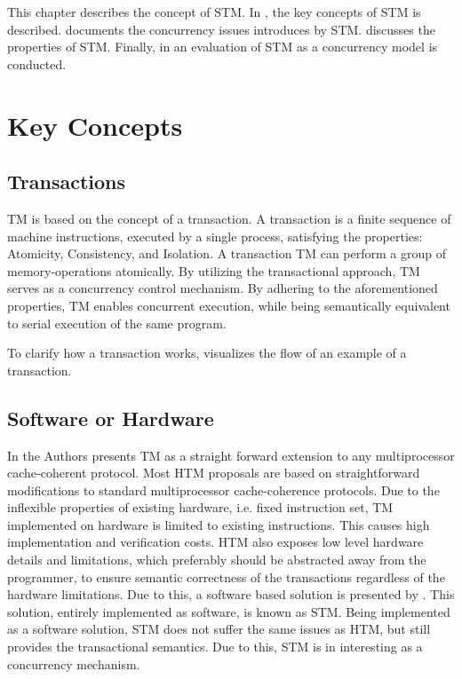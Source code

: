\makeatletter {}\makeatother
{}
This chapter describes the concept of \acl{STM}. In , the key concepts of \ac{STM} is described.  documents the concurrency issues introduces by \ac{STM}.  discusses the properties of \ac{STM}. Finally, in  an evaluation of \ac{STM} as a concurrency model is conducted.

\section{Key Concepts}
\label{sec:stm_keyconcepts}
\subsection{Transactions}
\ac{TM} is based on the concept of a transaction. A transaction is a finite sequence of machine instructions, executed by a single process, satisfying the properties: Atomicity, Consistency, and Isolation\cite[p. 2]{herlihy1993transactional}\cite[p. 14]{kalin2012clojure}. A transaction \ac{TM} can perform a group of memory-operations atomically\cite[48]{harris2005composable}. By utilizing the transactional approach, \ac{TM} serves as a concurrency control mechanism. By adhering to the aforementioned properties, \ac{TM} enables concurrent execution, while being semantically equivalent to serial execution of the same program.

To clarify how a transaction works, \bsref{} visualizes the flow of an example of a transaction.

\subsection{Software or Hardware}
In \cite{herlihy1993transactional} the Authors presents \ac{TM} as a straight forward extension to any multiprocessor cache-coherent protocol. Most \ac{HTM} proposals are based on straightforward modifications to standard multiprocessor cache-coherence protocols\cite{scott2011sync}. Due to the inflexible properties of existing hardware, i.e. fixed instruction set, \ac{TM} implemented on hardware is limited to existing instructions. This causes high implementation and verification costs\cite{cascaval2008software}. \ac{HTM} also exposes low level hardware details and limitations\cite{scott2011sync}, which preferably should be abstracted away from the programmer, to ensure semantic correctness of the transactions regardless of the hardware limitations. Due to this, a software based solution is presented by \cite{shavit1997software}. This solution, entirely implemented as software, is known as \acl{STM}. Being implemented as a software solution, \ac{STM} does not suffer the same issues as \ac{HTM}, but still provides the transactional semantics. Due to this, \ac{STM} is in interesting as a concurrency mechanism.

